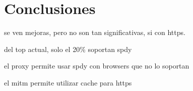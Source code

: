 \chapter{Conclusiones}

se ven mejoras, pero no son tan significativas, si con https.

del top actual, solo el 20\% soportan spdy

el proxy permite usar spdy con browsers que no lo soportan

el mitm permite utilizar cache para https

